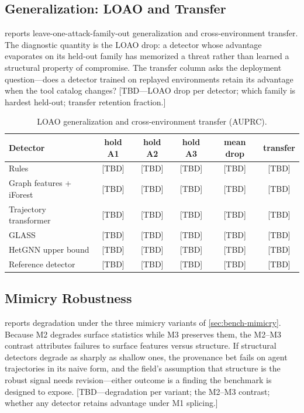 \subsection{Generalization: LOAO and Transfer}
\label{sec:results-loao}

 reports leave-one-attack-family-out generalization and cross-environment transfer. The diagnostic quantity is the LOAO drop: a detector whose advantage evaporates on its held-out family has memorized a threat rather than learned a structural property of compromise. The transfer column asks the deployment question---does a detector trained on replayed environments retain its advantage when the tool catalog changes? [TBD---LOAO drop per detector; which family is hardest held-out; transfer retention fraction.]

\begin{table}[tb]
  \centering
  \caption{LOAO generalization and cross-environment transfer (AUPRC).}
  \label{tab:loao}
  \begin{small}
  \begin{tabular}{lcccc|c}
    \toprule
    \textbf{Detector} & \textbf{hold A1} & \textbf{hold A2} & \textbf{hold A3} & \textbf{mean drop} & \textbf{transfer} \\
    \midrule
    Rules & [TBD] & [TBD] & [TBD] & [TBD] & [TBD] \\
    Graph features + iForest & [TBD] & [TBD] & [TBD] & [TBD] & [TBD] \\
    Trajectory transformer & [TBD] & [TBD] & [TBD] & [TBD] & [TBD] \\
    GLASS & [TBD] & [TBD] & [TBD] & [TBD] & [TBD] \\
    HetGNN upper bound & [TBD] & [TBD] & [TBD] & [TBD] & [TBD] \\
    Reference detector & [TBD] & [TBD] & [TBD] & [TBD] & [TBD] \\
    \bottomrule
  \end{tabular}
  \end{small}
\end{table}

\subsection{Mimicry Robustness}
\label{sec:results-mimicry}

 reports degradation under the three mimicry variants of \cref{sec:bench-mimicry}. Because M2 degrades surface statistics while M3 preserves them, the M2--M3 contrast attributes failures to surface features versus structure. If structural detectors degrade as sharply as shallow ones, the provenance bet fails on agent trajectories in its naive form, and the field's assumption that structure is the robust signal needs revision---either outcome is a finding the benchmark is designed to expose. [TBD---degradation per variant; the M2--M3 contrast; whether any detector retains advantage under M1 splicing.]

